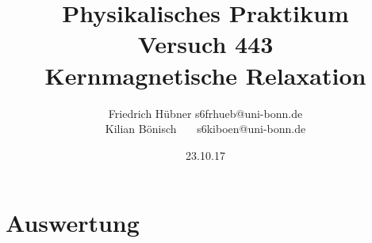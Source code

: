 \documentclass{article}
\newcommand{\RM}[1]{\MakeUppercase{\romannumeral #1}}
\begin{document}
\setlength{\parindent}{0em}   %
\title{Physikalisches Praktikum \RM{4}\\Versuch 443\\Kernmagnetische Relaxation}
\author{Friedrich Hübner \qquad s6frhueb@uni-bonn.de \\
  Kilian Bönisch \ \ \ \qquad s6kiboen@uni-bonn.de }
\date{23.10.17}

\maketitle

\thispagestyle{empty}

\newpage







\section{Auswertung}




\newpage
\printbibliography
\end{document}
